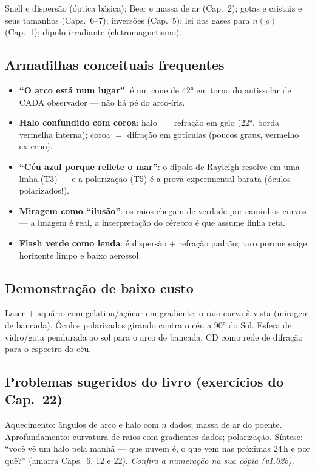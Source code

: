 Snell e dispersão (óptica básica); Beer e massa de ar (Cap.~2); gotas
e cristais e seus tamanhos (Caps.~6--7); inversões (Cap.~5); lei dos
gases para $n(\rho)$ (Cap.~1); dipolo irradiante (eletromagnetismo).

\subsection*{Armadilhas conceituais frequentes}

\begin{itemize}
  \item \textbf{``O arco está num lugar''}: é um cone de 42° em torno
        do antissolar de CADA observador — não há pé do arco-íris.
  \item \textbf{Halo confundido com coroa}: halo $=$ refração em gelo
        (22°, borda vermelha interna); coroa $=$ difração em gotículas
        (poucos graus, vermelho externo).
  \item \textbf{``Céu azul porque reflete o mar''}: o dipolo de
        Rayleigh resolve em uma linha (T3) — e a polarização (T5) é a
        prova experimental barata (óculos polarizados!).
  \item \textbf{Miragem como ``ilusão''}: os raios chegam de verdade
        por caminhos curvos — a imagem é real, a interpretação do
        cérebro é que assume linha reta.
  \item \textbf{Flash verde como lenda}: é dispersão $+$ refração
        padrão; raro porque exige horizonte limpo e baixo aerossol.
\end{itemize}

\subsection*{Demonstração de baixo custo}

Laser $+$ aquário com gelatina/açúcar em gradiente: o raio curva à
vista (miragem de bancada). Óculos polarizados girando contra o céu a
90° do Sol. Esfera de vidro/gota pendurada ao sol para o arco de
bancada. CD como rede de difração para o espectro do céu.

\subsection*{Problemas sugeridos do livro (exercícios do Cap.~22)}

Aquecimento: ângulos de arco e halo com $n$ dados; massa de ar do
poente. Aprofundamento: curvatura de raios com gradientes dados;
polarização. Síntese: ``você vê um halo pela manhã — que nuvem é, o
que vem nas próximas 24\,h e por quê?'' (amarra Caps.~6, 12 e 22).
\emph{Confira a numeração na sua cópia (v1.02b).}

